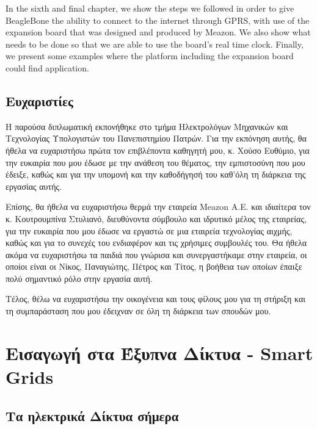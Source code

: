 \documentclass[12pt, a4paper, oneside]{report}
\begin{document}
\begin{english}
In the sixth and f\mbox{}inal chapter, we show the steps we followed in order to give BeagleBone the ability to connect to the internet through GPRS, with use of the expansion board that was designed and produced by Meazon. We also show what needs to be done so that we are able to use the board's real time clock. Finally, we present some examples where the platform including the expansion board could f\mbox{}ind application.
\end{english}
\clearpage

\section*{Ευχαριστίες}
Η παρούσα διπλωματική εκπονήθηκε στο τμήμα Ηλεκτρολόγων Μηχανικών και Τεχνολογίας Υπολογιστών του Πανεπιστημίου Πατρών. Για την εκπόνηση αυτής, θα ήθελα να ευχαριστήσω πρώτα τον επιβλέποντα καθηγητή μου, κ. Χούσο Ευθύμιο, για την ευκαιρία που μου έδωσε με την ανάθεση του θέματος, την εμπιστοσύνη που μου έδειξε, καθώς και για την υπομονή και την καθοδήγησή του καθ'όλη τη διάρκεια της εργασίας αυτής.

Επίσης, θα ήθελα να ευχαριστήσω θερμά την εταιρεία Meazon Α.Ε. και ιδιαίτερα τον κ. Κουτρουμπίνα Στυλιανό, διευθύνοντα σύμβουλο και ιδρυτικό μέλος της εταιρείας, για την ευκαιρία που μου έδωσε να εργαστώ σε μια εταιρεία τεχνολογίας αιχμής, καθώς και για το συνεχές του ενδιαφέρον και τις χρήσιμες συμβουλές του. Θα ήθελα ακόμα να ευχαριστήσω τα παιδιά που γνώρισα και συνεργαστήκαμε στην εταιρεία, οι οποίοι είναι οι Νίκος, Παναγιώτης, Πέτρος και Τίτος,  η βοήθεια των οποίων έπαιξε πολύ σημαντικό ρόλο στην εργασία αυτή.

Τέλος, θέλω να ευχαριστήσω την οικογένεια και τους φίλους μου για τη στήριξη και τη συμπαράσταση που μου έδειχναν σε όλη τη διάρκεια των σπουδών μου.

\clearpage

\tableofcontents
\listoffigures
\listoftables
\clearpage
\phantom{mpl}
\clearpage
{}
\chapter{Εισαγωγή στα Έξυπνα Δίκτυα - Smart Grids}

\section{Τα ηλεκτρικά Δίκτυα σήμερα}
\end{document}
